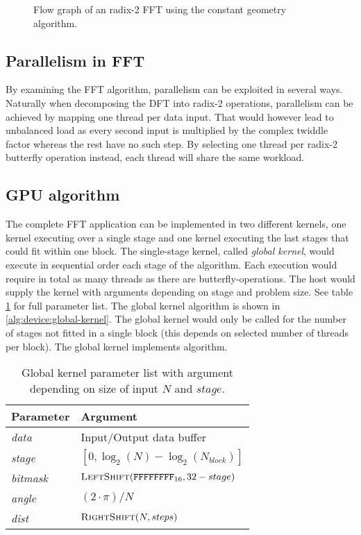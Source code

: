 \begin{figure}
	\centering
	
	\caption{Flow graph of an radix-2 \gls{FFT} using the constant geometry algorithm.}
	\label{fig:constant-geometry-8}
\end{figure}

\subsection{Parallelism in FFT}

By examining the \gls{FFT} algorithm, parallelism can be exploited in several ways. Naturally when decomposing the \gls{DFT} into radix-2 operations, parallelism can be achieved by mapping one thread per data input. That would however lead to unbalanced load as every second input is multiplied by the complex twiddle factor whereas the rest have no such step. By selecting one thread per radix-2 butterfly operation instead, each thread will share the same workload.

\subsection{GPU algorithm}

The complete \gls{FFT} application can be implemented in two different kernels, one kernel executing over a single stage and one kernel executing the last stages that could fit within one block. The single-stage kernel, called \emph{global kernel}, would execute in sequential order each stage of the algorithm. Each execution would require in total as many threads as there are butterfly-operations. The host would supply the kernel with arguments depending on stage and problem size. See table \ref{tab:global-kernel} for full parameter list. The global kernel algorithm is shown in \ref{alg:device:global-kernel}. The global kernel would only be called for the number of stages not fitted in a single block (this depends on selected number of threads per block). The global kernel implements {\CTALG} algorithm.

\begin{table}
	\centering
	\begin{tabular}{|l|l|}
		\hline
		Parameter & Argument \\ \hline
		\textit{data} & Input/Output data buffer \\ \hline
		\textit{stage} & $[0,\log_{2}(N) - \log_{2}(N_{block})]$ \\ \hline
		\textit{bitmask} & $\Call{LeftShift}{\texttt{FFFFFFFF}_{16}, 32 - stage}$ \\ \hline
		\textit{angle} & $(2 \cdot \pi)/N$ \\ \hline
		\textit{dist} & $\Call{RightShift}{N, steps}$ \\ \hline		
	\end{tabular}
	\caption{Global kernel parameter list with argument depending on size of input $N$ and $stage$.}
	\label{tab:global-kernel}
\end{table}

